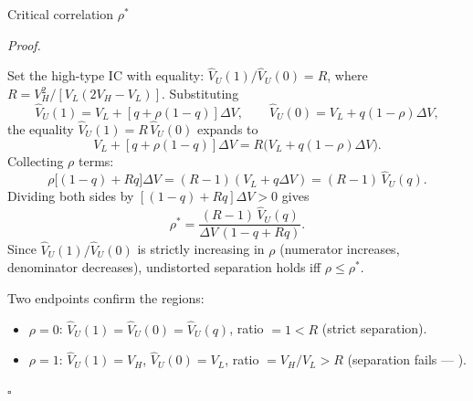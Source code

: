 \documentclass[10pt]{beamer}
\let\focusoldcitet\citet
\renewcommand{\citet}[1]{\textcolor{alert}{\focusoldcitet{#1}}}%
\newcommand{\Vhat}{\widehat{V}_U}
\renewenvironment{proof}{%
  \par\smallskip\noindent\textit{Proof.}\hspace{0.6em}\ignorespaces
}{%
  \unskip\nobreak\hfill$\square$\par\smallskip
}
\begin{document}
\begin{frame}[allowframebreaks]{Critical correlation $\rho^{*}$}\label{prf:ch6}
  \begin{proof}
    Set the high-type IC with equality:
    $\Vhat(1)/\Vhat(0) = R$, where
    $R = V_H^2/[V_L(2V_H-V_L)]$.
    Substituting
    \[
      \Vhat(1) = V_L + [q+\rho(1-q)]\Delta V,
      \qquad
      \Vhat(0) = V_L + q(1-\rho)\Delta V,
    \]
    the equality $\Vhat(1) = R\,\Vhat(0)$ expands to
    \[
      V_L + [q+\rho(1-q)]\Delta V
      = R\bigl(V_L + q(1-\rho)\Delta V\bigr).
    \]
    Collecting $\rho$ terms:
    \[
      \rho\bigl[(1-q)+Rq\bigr]\Delta V
      = (R-1)(V_L + q\Delta V)
      = (R-1)\,\Vhat(q).
    \]
    Dividing both sides by $[(1-q)+Rq]\Delta V > 0$ gives
    \[
      \rho^{*}
      = \dfrac{(R-1)\,\Vhat(q)}{\Delta V\,(1-q+Rq)}.
    \]
    Since $\Vhat(1)/\Vhat(0)$ is strictly increasing in $\rho$
    (numerator increases, denominator decreases), undistorted separation
    holds iff $\rho \le \rho^{*}$.

    Two endpoints confirm the regions:
    \begin{itemize}
      \item $\rho=0$: $\Vhat(1)=\Vhat(0)=\Vhat(q)$, ratio $=1 < R$
            (strict separation).
      \item $\rho=1$: $\Vhat(1)=V_H$, $\Vhat(0)=V_L$, ratio $=V_H/V_L > R$
            (separation fails --- \citet{fu2006}).
    \end{itemize}
  \end{proof}
\end{frame}
\end{document}
